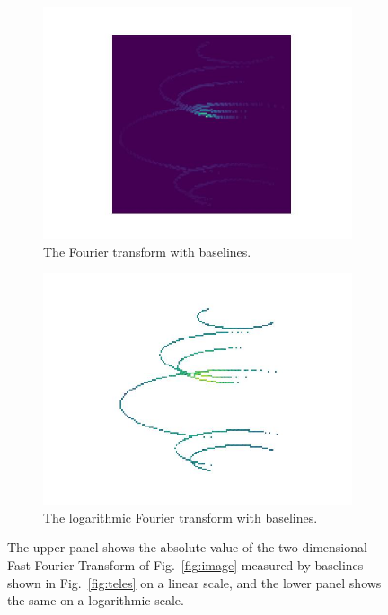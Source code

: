 \begin{figure}
	\centering
	\begin{subfigure}{\linewidth}
		\includegraphics[width=\linewidth]{fig/ft/ft_base.jpg}
		\caption{The Fourier transform with baselines.}
	\end{subfigure}\hfill
	\begin{subfigure}{\linewidth}
		\includegraphics[width=\linewidth]{fig/ft/ft_log_base.jpg}
		\caption{The logarithmic Fourier transform with baselines.}
	\end{subfigure}
	\caption{The upper panel shows the absolute value of the two-dimensional Fast Fourier Transform of Fig.~\ref{fig:image} measured by baselines shown in Fig.~\ref{fig:teles} on a linear scale, and the lower panel shows the same on a logarithmic scale.}
	\label{fig:ft_base}
\end{figure}
